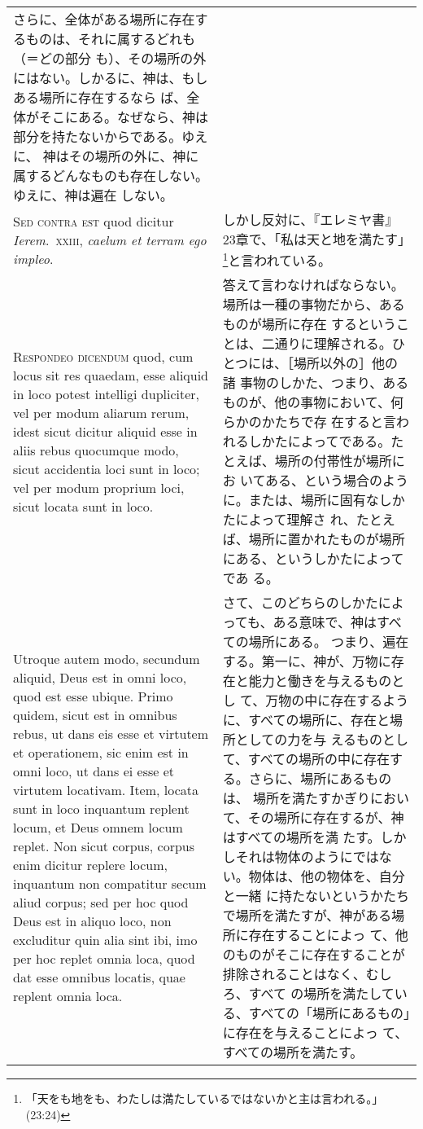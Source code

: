 \documentclass[10pt]{jsarticle} %
\begin{document}
\begin{longtable}{p{21em}p{21em}}
さらに、全体がある場所に存在するものは、それに属するどれも（＝どの部分
 も）、その場所の外にはない。しかるに、神は、もしある場所に存在するなら
 ば、全体がそこにある。なぜなら、神は部分を持たないからである。ゆえに、
 神はその場所の外に、神に属するどんなものも存在しない。ゆえに、神は遍在
 しない。

\\

{\scshape Sed contra est} quod dicitur {\itshape Ierem}.~{\scshape xxiii}, {\itshape caelum et terram ego impleo}.
&
しかし反対に、『エレミヤ書』23章で、「私は天と地を満たす」\footnote{「天をも地をも、わたしは満たしているではないかと主は言われる。」(23:24)}と言われている。

\\

{\scshape Respondeo dicendum} quod, cum locus sit res quaedam, esse aliquid in loco
 potest intelligi dupliciter, vel per modum aliarum rerum, idest sicut
 dicitur aliquid esse in aliis rebus quocumque modo, sicut accidentia
 loci sunt in loco; vel per modum proprium loci, sicut locata sunt in
 loco. 

&

答えて言わなければならない。場所は一種の事物だから、あるものが場所に存在
 するということは、二通りに理解される。ひとつには、［場所以外の］他の諸
 事物のしかた、つまり、あるものが、他の事物において、何らかのかたちで存
 在すると言われるしかたによってである。たとえば、場所の付帯性が場所にお
 いてある、という場合のように。または、場所に固有なしかたによって理解さ
 れ、たとえば、場所に置かれたものが場所にある、というしかたによってであ
 る。

\\

Utroque autem modo, secundum aliquid, Deus est in omni loco,
 quod est esse ubique. Primo quidem, sicut est in omnibus rebus, ut dans
 eis esse et virtutem et operationem, sic enim est in omni loco, ut dans
 ei esse et virtutem locativam. Item, locata sunt in loco inquantum
 replent locum, et Deus omnem locum replet. Non sicut corpus, corpus
 enim dicitur replere locum, inquantum non compatitur secum aliud
 corpus; sed per hoc quod Deus est in aliquo loco, non excluditur quin
 alia sint ibi, imo per hoc replet omnia loca, quod dat esse omnibus
 locatis, quae replent omnia loca.
&

さて、このどちらのしかたによっても、ある意味で、神はすべての場所にある。
 つまり、遍在する。第一に、神が、万物に存在と能力と働きを与えるものとし
 て、万物の中に存在するように、すべての場所に、存在と場所としての力を与
 えるものとして、すべての場所の中に存在する。さらに、場所にあるものは、
 場所を満たすかぎりにおいて、その場所に存在するが、神はすべての場所を満
 たす。しかしそれは物体のようにではない。物体は、他の物体を、自分と一緒
 に持たないというかたちで場所を満たすが、神がある場所に存在することによっ
 て、他のものがそこに存在することが排除されることはなく、むしろ、すべて
 の場所を満たしている、すべての「場所にあるもの」に存在を与えることによっ
 て、すべての場所を満たす。


\end{longtable}
\end{document}
